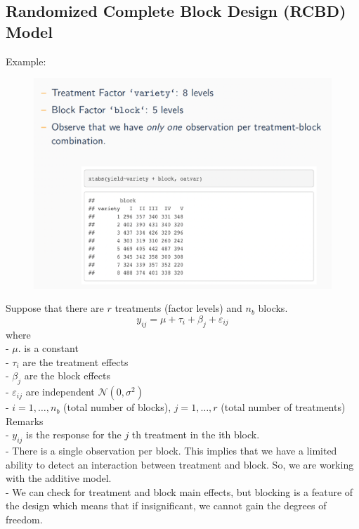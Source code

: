 \documentclass[11pt,a4paper]{article}
\begin{document}
\subsection{ Randomized Complete Block Design (RCBD) Model}
Example:\\
\begin{center}\begin{figure}[htbp]
    \centering
    \includegraphics[scale=0.5]{CRBD_example.png}
    \caption{}
    \label{}
\end{figure}\end{center}

Suppose that there are $r$ treatments (factor levels) and $n_b$ blocks.
$$
y_{i j}=\mu+\tau_{i}+\beta_{j}+\varepsilon_{i j}
$$
where\\
- $\mu .$ is a constant\\
- $\tau_{i}$ are the treatment effects\\
- $\beta_{j}$ are the block effects\\
- $\varepsilon_{i j}$ are independent $\mathcal{N}\left(0, \sigma^{2}\right)$\\
- $i=1, \ldots, n_{b}$ (total number of blocks), $j=1, \ldots, r$ (total number of treatments)\\

Remarks\\
- $y_{i j}$ is the response for the $j$ th treatment in the ith block.\\
- There is a single observation per block. This implies that we have a limited ability to detect an interaction between treatment and block. So, we are working with the additive model.\\
- We can check for treatment and block main effects, but blocking is a feature of the design which means that if insignificant, we cannot gain the degrees of freedom.\\
\end{document}
